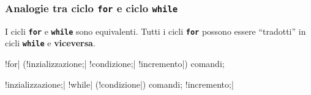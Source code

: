 \begin{frame}[fragile]\frametitle{Analogie tra ciclo \texttt{for} e ciclo \texttt{while}}

  I cicli \textbf{\texttt{for}} e \textbf{\texttt{while}} sono equivalenti. Tutti i cicli \textbf{\texttt{for}} 
  possono essere ``tradotti'' in cicli \textbf{\texttt{while}} e \textbf{viceversa}.
  
  \begin{JavaCodePlain}[commandchars=\\!|]
    \Word!for| (\Blue!inzializzazione;| \Green!condizione;| \Violet!incremento|) {
      comandi;
    }
  \end{JavaCodePlain}

  \begin{JavaCodePlain}[commandchars=\\!|]
    \Blue!inzializzazione;|
    \Word!while| (\Green!condizione|) {
      comandi;
      \Violet!incremento;|
    }
  \end{JavaCodePlain}
\end{frame}

